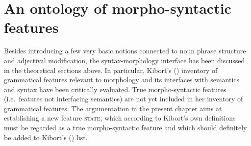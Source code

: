 \section{An ontology of morpho-syntactic features}
Besides introducing a few very basic notions connected to noun phrase structure and adjectival modification, the syntax-morphology interface has been discussed in the theoretical sections above. In particular, Kibort's (\citeyear{kibort2008a}) inventory of grammatical features relevant to morphology and its interfaces with semantics and syntax have been critically evaluated. True morpho-syntactic features (i.e.~features not interfacing semantics) are not yet included in her inventory of grammatical features. The argumentation in the present chapter aims at establishing a new feature \textsc{state}, which according to Kibort's own definitions must be regarded as a true morpho-syntactic feature and which should definitely be added to Kibort's (\citeyear{kibort2008a}) list. 

